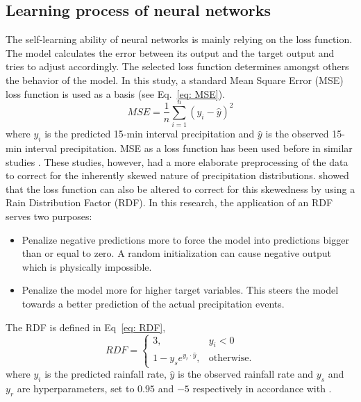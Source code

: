 \documentclass[twocolumn, 10pt, a4paper]{memoir}
\begin{document}
	\subsection{Learning process of neural networks} \label{Learning NN}
	The self-learning ability of neural networks is mainly relying on the loss function. The model calculates the error between its output and the target output and tries to adjust accordingly. The selected loss function determines amongst others the behavior of the model. In this study, a standard Mean Square Error (MSE) loss function is used as a basis (see Eq.~\ref{eq: MSE}).
	\begin{equation} \label{eq: MSE}
		MSE = \frac{1}{n} \sum_{i=1}^{n} (y_i - \hat{y})^2
	\end{equation}
	where ${y_i}$ is the predicted 15-min interval precipitation and $\hat{y}$ is the observed 15-min interval precipitation.
	MSE as a loss function has been used before in similar studies \cite{Pudashine2020, Diba2021}. These studies, however, had a more elaborate preprocessing of the data to correct for the inherently skewed nature of precipitation distributions.  showed that the loss function can also be altered to correct for this skewedness by using a Rain Distribution Factor (RDF). In this research, the application of an RDF serves two purposes:
	
	\begin{itemize}
		\item Penalize negative predictions more to force the model into predictions bigger than or equal to zero. A random initialization can cause negative output which is physically impossible.
		\item Penalize the model more for higher target variables. This steers the model towards a better prediction of the actual precipitation events.
	\end{itemize}
	\vspace{3mm}
	The RDF is defined in Eq~\ref{eq: RDF},
	\begin{equation}
		\label{eq: RDF}
		RDF=\begin{cases}
			3, & y_i < 0\\
			1-y_s e^{y_r\cdot{}\hat{y}}, & \text{otherwise}.
		\end{cases}
	\end{equation}
	where $y_i$ is the predicted rainfall rate, $\hat{y}$ is the observed rainfall rate and $y_s$ and $y_r$ are hyperparameters, set to $0.95$ and $-5$ respectively in accordance with .
	
\end{document}
